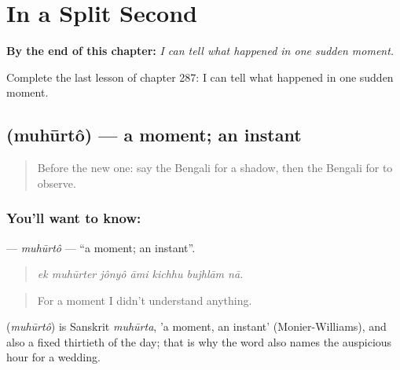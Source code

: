 
\chapter{In a Split Second}
\label{ch:bn-in-a-split-second}

\begin{chapteropening}
\textbf{By the end of this chapter:} \emph{I can tell what happened in one sudden moment.}

Complete the last lesson of chapter 287: I can tell what happened in one sudden moment.
\end{chapteropening}

\section[\texorpdfstring{\bn{মুহূর্ত} (muhūrtô)}{মুহূর্ত (muhūrtô)}]{ (muhūrtô) — a moment; an instant}

\label{lesson:BN-C287-muhurto}



\begin{quote}
Before the new one: say the Bengali for a shadow, then the Bengali for to observe.
\end{quote}

\subsection*{You'll want to know: }
\textbf{} — \emph{muhūrtô} — \textquotedblleft{}a moment; an instant\textquotedblright{}.

\begin{quote}
      
\end{quote}

\begin{quote}
\emph{ek muhūrter jônyô āmi kichhu bujhlām nā.}
\end{quote}

\begin{quote}
For a moment I didn't understand anything.
\end{quote}

\begin{cousinweb}
\textbf{} (\emph{muhūrtô}) is Sanskrit \emph{muhūrta}, 'a moment, an instant' (Monier-Williams), and also a fixed thirtieth of the day; that is why the word also names the auspicious hour for a wedding.
\end{cousinweb}

